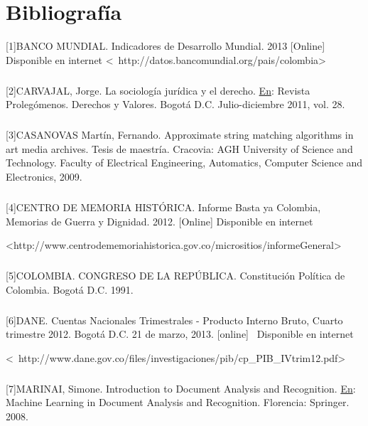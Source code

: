 \chapter{Bibliograf\'ia}
\label{sec:biblio}
[1]BANCO MUNDIAL. Indicadores de Desarrollo Mundial. 2013 [Online] Disponible en internet 
\textless  http://datos.bancomundial.org/pais/colombia\textgreater
\paragraph{}
[2]CARVAJAL, Jorge. La sociolog\'ia jur\'idica y el derecho. \underline{En}: Revista Proleg\'omenos. Derechos y Valores. Bogot\'a D.C. Julio-diciembre 2011, vol. 28.
\paragraph{}
[3]CASANOVAS Mart\'in, Fernando. Approximate string matching algorithms in art media archives.
Tesis de maestr\'ia. Cracovia:  AGH University of Science and Technology.
Faculty of Electrical Engineering, Automatics, Computer Science and Electronics, 2009.
\paragraph{}
[4]CENTRO DE MEMORIA HIST\'ORICA. Informe Basta ya Colombia, Memorias de Guerra y Dignidad. 2012. [Online] Disponible en internet 

\textless http://www.centrodememoriahistorica.gov.co/micrositios/informeGeneral\textgreater
\paragraph{}
[5]COLOMBIA. CONGRESO DE LA REP\'UBLICA. Constituci\'on Pol\'itica de Colombia. Bogot\'a D.C. 1991.
\paragraph{}
[6]DANE. Cuentas Nacionales Trimestrales - Producto Interno Bruto, Cuarto trimestre 2012. Bogot\'a D.C. 21 de marzo, 2013. [online]  Disponible en internet 

\textless  http://www.dane.gov.co/files/investigaciones/pib/cp\_PIB\_IVtrim12.pdf\textgreater
\paragraph{}
[7]MARINAI, Simone. Introduction to Document Analysis and Recognition. 
\underline{En}: Machine Learning in Document Analysis and Recognition. Florencia: Springer. 2008.

